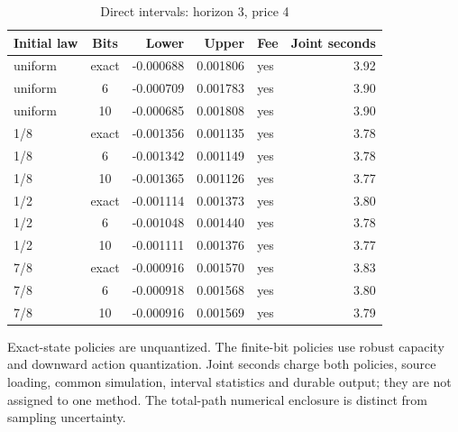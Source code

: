 \begin{table}[htbp]
\centering
\caption{Direct intervals: horizon 3, price 4}\label{tab:direct-full48-3-4}
\footnotesize
\begin{tabular}{lcrrlr}
\toprule
Initial law & Bits & Lower & Upper & Fee & Joint seconds\\
\midrule
uniform & exact & -0.000688 & 0.001806 & yes & 3.92 \\
uniform & 6 & -0.000709 & 0.001783 & yes & 3.90 \\
uniform & 10 & -0.000685 & 0.001808 & yes & 3.90 \\
1/8 & exact & -0.001356 & 0.001135 & yes & 3.78 \\
1/8 & 6 & -0.001342 & 0.001149 & yes & 3.78 \\
1/8 & 10 & -0.001365 & 0.001126 & yes & 3.77 \\
1/2 & exact & -0.001114 & 0.001373 & yes & 3.80 \\
1/2 & 6 & -0.001048 & 0.001440 & yes & 3.78 \\
1/2 & 10 & -0.001111 & 0.001376 & yes & 3.77 \\
7/8 & exact & -0.000916 & 0.001570 & yes & 3.83 \\
7/8 & 6 & -0.000918 & 0.001568 & yes & 3.80 \\
7/8 & 10 & -0.000916 & 0.001569 & yes & 3.79 \\
\bottomrule
\end{tabular}
\begin{minipage}{0.97\linewidth}\footnotesize\vspace{3pt}
Exact-state policies are unquantized. The finite-bit policies use robust capacity and downward action quantization. Joint seconds charge both policies, source loading, common simulation, interval statistics and durable output; they are not assigned to one method. The total-path numerical enclosure is distinct from sampling uncertainty.
\end{minipage}
\end{table}
